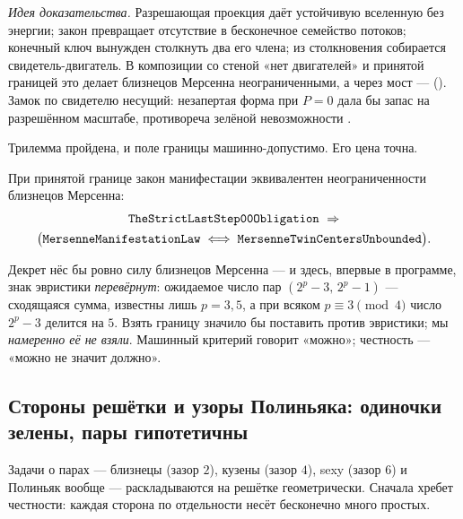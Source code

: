 \emph{Идея доказательства.} Разрешающая проекция даёт устойчивую вселенную без энергии; закон
превращает отсутствие в бесконечное семейство потоков; конечный ключ вынужден столкнуть два его
члена; из столкновения собирается свидетель-двигатель. В композиции со стеной «нет двигателей» и
принятой границей это делает близнецов Мерсенна неограниченными, а через мост ---
 (\green{}). Замок по
свидетелю несущий: незапертая форма при $P=0$ дала бы запас на разрешённом масштабе, противореча
зелёной невозможности .

Трилемма пройдена, и поле границы  машинно-допустимо. Его цена точна.

\begin{theorem}\label{thm:mersenneManifestationLaw_iff_unbounded_of_boundary}
\green{}\; При принятой границе  закон манифестации эквивалентен
неограниченности близнецов Мерсенна:
\begin{equation}\label{eq:mersenne-price}
\begin{gathered}
\texttt{TheStrictLastStep00Obligation}\ \Rightarrow\\
\bigl(\texttt{MersenneManifestationLaw}\iff\texttt{MersenneTwinCentersUnbounded}\bigr).
\end{gathered}
\end{equation}
\end{theorem}

Декрет нёс бы ровно силу близнецов Мерсенна --- и здесь, впервые в программе, знак эвристики
\emph{перевёрнут}: ожидаемое число пар $(2^p-3,\,2^p-1)$ --- сходящаяся сумма, известны лишь
$p=3,5$, а при всяком $p\equiv3\pmod4$ число $2^p-3$ делится на $5$. Взять границу значило бы
поставить против эвристики; мы \emph{намеренно её не взяли}. Машинный критерий говорит «можно»;
честность --- «можно не значит должно».

\subsection{Стороны решётки и узоры Полиньяка: одиночки зелены, пары гипотетичны}

Задачи о парах --- близнецы (зазор $2$), кузены (зазор $4$), sexy (зазор $6$) и Полиньяк вообще ---
раскладываются на решётке геометрически. Сначала хребет честности: каждая сторона по отдельности
несёт бесконечно много простых.

